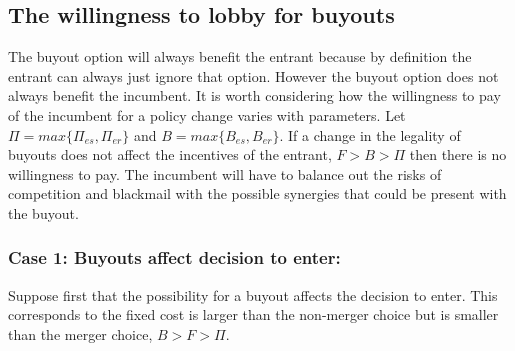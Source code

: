 \subsection{The willingness to lobby for buyouts}

The buyout option will always benefit the entrant because by definition the entrant can always just ignore that option. However the buyout option does not always benefit the incumbent. It is worth considering how the willingness to pay of the incumbent for a policy change varies with parameters.
Let $\Pi = max\{ \Pi_{es},\Pi_{er} \}$ and $B = max\{ B_{es},B_{er} \}$. If a change in the legality of buyouts does not affect the incentives of the entrant, $F>B>\Pi$ then there is no willingness to pay. The incumbent will have to balance out the risks of competition and blackmail with the possible synergies that could be present with the buyout.

\subsubsection{Case 1: Buyouts affect decision to enter: } \label{case:decision}

Suppose first that the possibility for a buyout affects the decision to enter. This corresponds to the fixed cost is larger than the non-merger choice but is smaller than the merger choice, $B>F> \Pi$.

